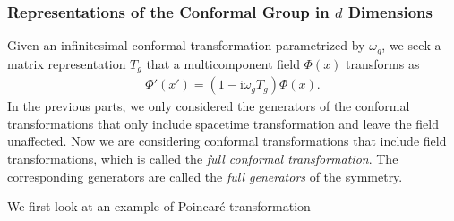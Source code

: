 \documentclass[10pt]{article}
\newcommand{\ii}{\mathrm{i}}
\begin{document}
\subsubsection{Representations of the Conformal Group in \texorpdfstring{$d$}{d} Dimensions}
\begin{intu}
    Given an infinitesimal conformal transformation parametrized by $\omega_g$, we seek a matrix representation $T_g$ that a multicomponent field $\Phi(x)$ transforms as
    \begin{align}
        \Phi'(x')=(1-\ii\omega_g T_g)\Phi(x).
    \end{align}
    In the previous parts, we only considered the generators of the conformal transformations that only include spacetime transformation and leave the field unaffected.
    Now we are considering conformal transformations that include field transformations, which is called the \textit{full conformal transformation}.
    The corresponding generators are called the \textit{full generators} of the symmetry.
\end{intu}
We first look at an example of Poincar\'e transformation
\end{document}
